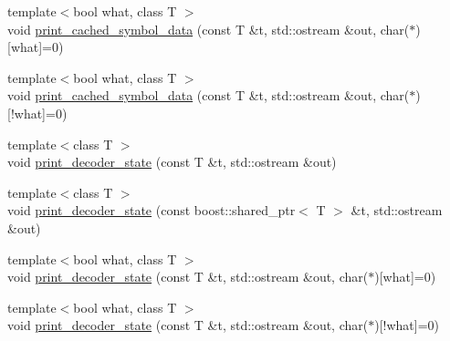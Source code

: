 \begin{DoxyCompactItemize}
\begin{DoxyCompactList}\small\item\em \end{DoxyCompactList}\item 
{\footnotesize template$<$bool what, class T $>$ }\\void \hyperlink{group__generic__api_ga5dde22f82c20ea17c098f00c3f5aaa42}{print\-\_\-cached\-\_\-symbol\-\_\-data} (const T \&t, std\-::ostream \&out, char($\ast$)\mbox{[}what\mbox{]}=0)
\begin{DoxyCompactList}\small\item\em \end{DoxyCompactList}\item 
{\footnotesize template$<$bool what, class T $>$ }\\void \hyperlink{group__generic__api_ga07e81e56542b4179eda44d2a2a3f89aa}{print\-\_\-cached\-\_\-symbol\-\_\-data} (const T \&t, std\-::ostream \&out, char($\ast$)\mbox{[}!what\mbox{]}=0)
\begin{DoxyCompactList}\small\item\em \end{DoxyCompactList}\item 
{\footnotesize template$<$class T $>$ }\\void \hyperlink{group__generic__api_ga924f8d925a9bf15ef020657f853907f0}{print\-\_\-decoder\-\_\-state} (const T \&t, std\-::ostream \&out)
\item 
{\footnotesize template$<$class T $>$ }\\void \hyperlink{group__generic__api_gac3889d72f30da12931b08209957dd076}{print\-\_\-decoder\-\_\-state} (const boost\-::shared\-\_\-ptr$<$ T $>$ \&t, std\-::ostream \&out)
\begin{DoxyCompactList}\small\item\em \end{DoxyCompactList}\item 
{\footnotesize template$<$bool what, class T $>$ }\\void \hyperlink{group__generic__api_ga4f59151196d0d2e957a96438a149087f}{print\-\_\-decoder\-\_\-state} (const T \&t, std\-::ostream \&out, char($\ast$)\mbox{[}what\mbox{]}=0)
\begin{DoxyCompactList}\small\item\em \end{DoxyCompactList}\item 
{\footnotesize template$<$bool what, class T $>$ }\\void \hyperlink{group__generic__api_gaefd74f1db665a902b41794daf1b1b070}{print\-\_\-decoder\-\_\-state} (const T \&t, std\-::ostream \&out, char($\ast$)\mbox{[}!what\mbox{]}=0)

\end{DoxyCompactItemize}
